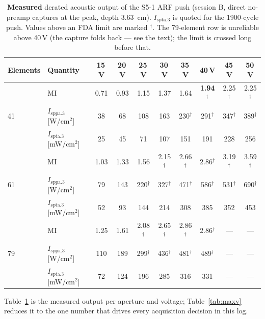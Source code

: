 \documentclass[11pt,a4paper]{article}
\begin{document}
\begin{table}[h]
\centering\small
\caption{\textbf{Measured} derated acoustic output of the S5-1 ARF push (session B, direct
no-preamp captures at the peak, depth \SI{3.63}{\centi\metre}). $I_\mathrm{spta.3}$ is quoted for
the 1900-cycle push. Values above an FDA limit are marked $^{\dagger}$. The 79-element row is
unreliable above 40\,V (the capture folds back --- see the text); the limit is crossed long before
that.}
\label{tab:safety}
\begin{tabular}{@{}llcccccccc@{}}
\toprule
\textbf{Elements} & \textbf{Quantity} & \textbf{15\,V} & \textbf{20\,V} & \textbf{25\,V} &
\textbf{30\,V} & \textbf{35\,V} & \textbf{40\,V} & \textbf{45\,V} & \textbf{50\,V} \\
\midrule
\multirow{3}{*}{41} & MI                & 0.71 & 0.93 & 1.15 & 1.37 & 1.64 & \textbf{1.94}$^{\dagger}$ & 2.25$^{\dagger}$ & 2.25$^{\dagger}$ \\
 & $I_\mathrm{sppa.3}$ [W/cm$^2$]        & 38 & 68 & 108 & 163 & 230$^{\dagger}$ & 291$^{\dagger}$ & 347$^{\dagger}$ & 389$^{\dagger}$ \\
 & $I_\mathrm{spta.3}$ [mW/cm$^2$]       & 25 & 45 & 71 & 107 & 151 & 191 & 228 & 256 \\
\midrule
\multirow{3}{*}{61} & MI                & 1.03 & 1.33 & 1.56 & 2.15$^{\dagger}$ & 2.66$^{\dagger}$ & 2.86$^{\dagger}$ & 3.19$^{\dagger}$ & 3.59$^{\dagger}$ \\
 & $I_\mathrm{sppa.3}$ [W/cm$^2$]        & 79 & 143 & 220$^{\dagger}$ & 327$^{\dagger}$ & 471$^{\dagger}$ & 586$^{\dagger}$ & 531$^{\dagger}$ & 690$^{\dagger}$ \\
 & $I_\mathrm{spta.3}$ [mW/cm$^2$]       & 52 & 93 & 144 & 214 & 308 & 385 & 352 & 453 \\
\midrule
\multirow{3}{*}{79} & MI                & 1.25 & 1.61 & 2.08$^{\dagger}$ & 2.65$^{\dagger}$ & 2.86$^{\dagger}$ & 2.86$^{\dagger}$ & --- & --- \\
 & $I_\mathrm{sppa.3}$ [W/cm$^2$]        & 110 & 189 & 299$^{\dagger}$ & 436$^{\dagger}$ & 481$^{\dagger}$ & 489$^{\dagger}$ & --- & --- \\
 & $I_\mathrm{spta.3}$ [mW/cm$^2$]       & 72 & 124 & 196 & 285 & 316 & 331 & --- & --- \\
\bottomrule
\end{tabular}
\end{table}

Table~\ref{tab:safety} is the measured output per aperture and voltage; Table~\ref{tab:maxv}
reduces it to the one number that drives every acquisition decision in this log.
\end{document}
